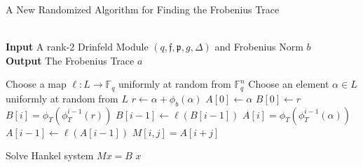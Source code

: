 \documentclass{acmart}
\theoremstyle{remark}
\numberwithin{equation}{section}
\newcommand{\frakf}{\mathfrak{f}}
\begin{document}
 \begin{algorithm}
\caption{A New Randomized Algorithm for Finding the Frobenius Trace}\label{euclid}
\begin{algorithmic}[1]
 \\
\hspace*{\algorithmicindent} \textbf{Input} A rank-2 Drinfeld Module $(q,\frakf,\mathfrak{p}, g, \Delta)$ and Frobenius Norm $b$\\
 \hspace*{\algorithmicindent} \textbf{Output} The Frobenius Trace $a$
 
 \State Choose a map $\ell: L \to \mathbb{F}_q$ uniformly at random from $\mathbb{F}_q^n$
 \State Choose an element $\alpha \in L$ uniformly at random from $L$
\State $r \gets \alpha + \phi_b(\alpha)$
\State $A[0] \gets \alpha$
\State $B[0] \gets r$
\State $B[i] = \phi_T(\phi_T^{i-1}(r))$
\State $B[i-1] \gets \ell(B[i-1])$
\EndFor
{}
\State $A[i] = \phi_T(\phi_T^{i-1}(\alpha))$
\State $A[i-1] \gets \ell(A[i-1])$
\EndFor
{}
\State $M[i,j] = A[i + j]$
\EndFor
\EndFor

\State Solve Hankel system $Mx = B$
\Return $x$

\EndProcedure
\end{algorithmic}
\end{algorithm}







\end{document}
